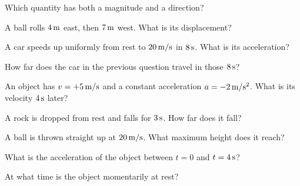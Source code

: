 \begin{exo}{}
Which quantity has both a magnitude and a direction?
\end{exo}
\begin{exo}{}
A ball rolls $4\,\mathrm{m}$ east, then $7\,\mathrm{m}$ west. What is its displacement?
\end{exo}
\begin{exo}{}
A car speeds up uniformly from rest to $20\,\mathrm{m/s}$ in $8\,\mathrm{s}$. What is its acceleration?
\choices{$2.5\mss$}{$160\mss$}{$0.4\mss$}{$12\mss$}
\end{exo}
\begin{exo}{}
How far does the car in the previous question travel in those $8\,\mathrm{s}$?
\choices{$160\m$}{$40\m$}{$80\m$}{$20\m$}
\end{exo}
\begin{exo}{}
An object has $v=+5\,\mathrm{m/s}$ and a constant acceleration $a=-2\,\mathrm{m/s^2}$. What is its velocity $4\,\mathrm{s}$ later?
\choices{$+13\ms$}{$-3\ms$}{$+3\ms$}{$-13\ms$}
\end{exo}
\begin{exo}{}
A rock is dropped from rest and falls for $3\,\mathrm{s}$. How far does it fall?
\choices{$30\m$}{$90\m$}{$15\m$}{$45\m$}
\end{exo}
\begin{exo}{}
A ball is thrown straight up at $20\,\mathrm{m/s}$. What maximum height does it reach?
\choices{$40\m$}{$20\m$}{$10\m$}{$2\m$}
\end{exo}
\gVb
\begin{exo}{}
What is the acceleration of the object between $t=0$ and $t=4\,\mathrm{s}$?
\end{exo}
\begin{exo}{}
At what time is the object momentarily at rest?
\end{exo}
